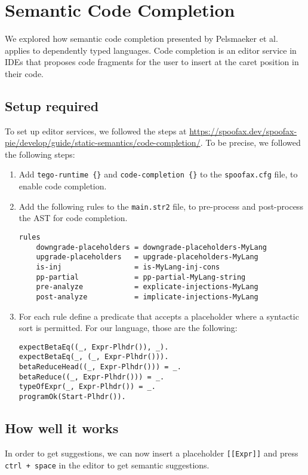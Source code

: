 \chapter{\label{chap:editor-services}Semantic Code Completion}
 
We explored how semantic code completion presented by Pelsmaeker et al.~\cite{codecompletion} applies to dependently typed languages. Code completion is an editor service in IDEs that proposes code fragments for the user to insert at the caret position in their code.

\section{Setup required}
To set up editor services, we followed the steps at  \url{https://spoofax.dev/spoofax-pie/develop/guide/static-semantics/code-completion/}. To be precise, we followed the following steps:
\begin{enumerate}
	\item Add \verb|tego-runtime {}| and \verb|code-completion {}| to the \verb|spoofax.cfg| file, to enable code completion.
	\item Add the following rules to the \verb|main.str2| file, to pre-process and post-process the AST for code completion.
	\begin{lstlisting}
rules
	downgrade-placeholders = downgrade-placeholders-MyLang
	upgrade-placeholders   = upgrade-placeholders-MyLang
	is-inj                 = is-MyLang-inj-cons
	pp-partial             = pp-partial-MyLang-string
	pre-analyze            = explicate-injections-MyLang
	post-analyze           = implicate-injections-MyLang
	\end{lstlisting}
	\item For each rule define a predicate that accepts a placeholder where a syntactic sort is permitted. For our language, those are the following:
	\begin{lstlisting}
expectBetaEq((_, Expr-Plhdr()), _).
expectBetaEq(_, (_, Expr-Plhdr())).
betaReduceHead((_, Expr-Plhdr())) = _.
betaReduce((_, Expr-Plhdr())) = _.
typeOfExpr(_, Expr-Plhdr()) = _.
programOk(Start-Plhdr()).
	\end{lstlisting}
	
\end{enumerate}

\section{How well it works}
In order to get suggestions, we can now insert a placeholder \verb|[[Expr]]| and press \verb|ctrl + space| in the editor to get semantic suggestions.

